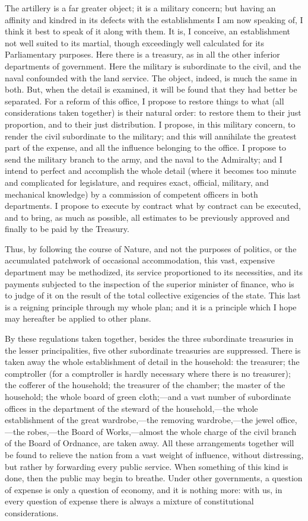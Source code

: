The artillery is a far greater object; it is a military concern; but having an affinity and kindred in its defects with the establishments I am now speaking of, I think it best to speak of it along with them. It is, I conceive, an establishment not well suited to its martial, though exceedingly well calculated for its Parliamentary purposes. Here there is a treasury, as in all the other inferior departments of government. Here the military is subordinate to the civil, and the naval confounded with the land service. The object, indeed, is much the same in both. But, when the detail is examined, it will be found that they had better be separated. For a reform of this office, I propose to restore things to what (all considerations taken together) is their natural order: to restore them to their just proportion, and to their just distribution. I propose, in this military concern, to render the civil subordinate to the military; and this will annihilate the greatest part of the expense, and all the influence belonging to the office. I propose to send the military branch to the army, and the naval to the Admiralty; and I intend to perfect and accomplish the whole detail (where it becomes too minute and complicated for legislature, and requires exact, official, military, and mechanical knowledge) by a commission of competent officers in both departments. I propose to execute by contract what by contract can be executed, and to bring, as much as possible, all estimates to be previously approved and finally to be paid by the Treasury.

Thus, by following the course of Nature, and not the purposes of politics, or the accumulated patchwork of occasional accommodation, this vast, expensive department may be methodized, its service proportioned to its necessities, and its payments subjected to the inspection of the superior minister of finance, who is to judge of it on the result of the total collective exigencies of the state. This last is a reigning principle through my whole plan; and it is a principle which I hope may hereafter be applied to other plans.

By these regulations taken together, besides the three subordinate treasuries in the lesser principalities, five other subordinate treasuries are suppressed. There is taken away the whole establishment of detail in the household: the treasurer; the comptroller (for a comptroller is hardly necessary where there is no treasurer); the cofferer of the household; the treasurer of the chamber; the master of the household; the whole board of green cloth;—and a vast number of subordinate offices in the department of the steward of the household,—the whole establishment of the great wardrobe,—the removing wardrobe,—the jewel office,—the robes,—the Board of Works,—almost the whole charge of the civil branch of the Board of Ordnance, are taken away. All these arrangements together will be found to relieve the nation from a vast weight of influence, without distressing, but rather by forwarding every public service. When something of this kind is done, then the public may begin to breathe. Under other governments, a question of expense is only a question of economy, and it is nothing more: with us, in every question of expense there is always a mixture of constitutional considerations.

